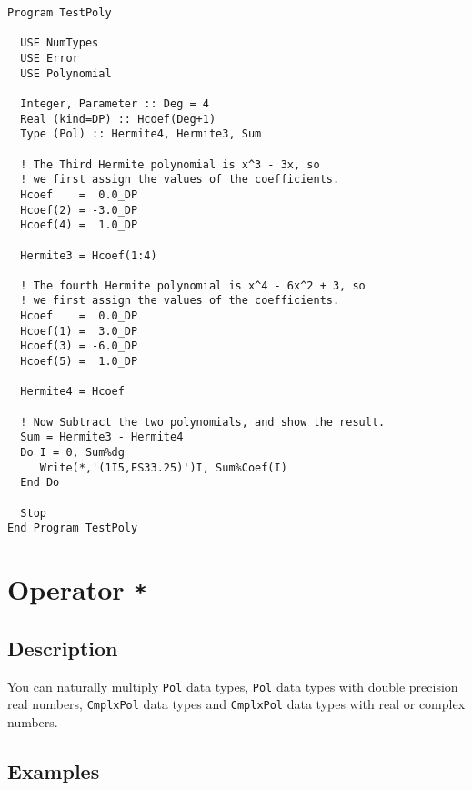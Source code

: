 \begin{lstlisting}[emph=Type,
                   emphstyle=\color{blue},
                   frame=trBL,
                   caption=Substracting polynomials.,
                   label=minuspol]
Program TestPoly

  USE NumTypes
  USE Error
  USE Polynomial

  Integer, Parameter :: Deg = 4
  Real (kind=DP) :: Hcoef(Deg+1)
  Type (Pol) :: Hermite4, Hermite3, Sum

  ! The Third Hermite polynomial is x^3 - 3x, so
  ! we first assign the values of the coefficients.
  Hcoef    =  0.0_DP
  Hcoef(2) = -3.0_DP
  Hcoef(4) =  1.0_DP

  Hermite3 = Hcoef(1:4)

  ! The fourth Hermite polynomial is x^4 - 6x^2 + 3, so
  ! we first assign the values of the coefficients.
  Hcoef    =  0.0_DP
  Hcoef(1) =  3.0_DP
  Hcoef(3) = -6.0_DP
  Hcoef(5) =  1.0_DP

  Hermite4 = Hcoef

  ! Now Subtract the two polynomials, and show the result.
  Sum = Hermite3 - Hermite4
  Do I = 0, Sum%dg
     Write(*,'(1I5,ES33.25)')I, Sum%Coef(I)
  End Do

  Stop
End Program TestPoly
\end{lstlisting}

\section{Operator \texttt{*}}

\subsection{Description}

You can naturally multiply \texttt{Pol} data types, \texttt{Pol}
data types with double precision real numbers, \texttt{CmplxPol} data
types and \texttt{CmplxPol} data types with real or complex numbers.

\subsection{Examples}

